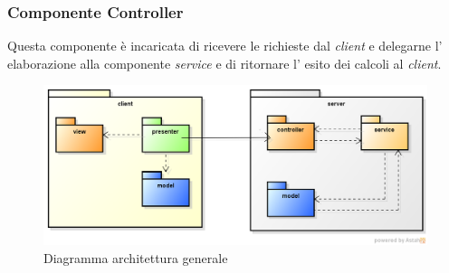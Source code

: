 \subsubsection{Componente Controller}
Questa componente è incaricata di ricevere le richieste dal \textit{client} e delegarne l' elaborazione alla componente \textit{service} e di ritornare l' esito dei calcoli al \textit{client}.
\begin{figure}[H] \centering \includegraphics[width=%
\textwidth]
{./other/MVPIntroduzione.png} \caption{Diagramma architettura generale}
\end{figure}